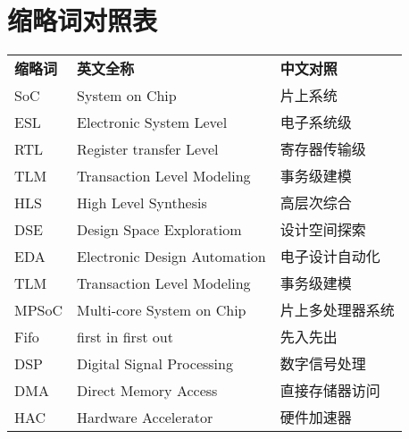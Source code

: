 
\chapter{缩略词对照表}
\begin{table}[]
  \normalsize
  \begin{tabular}{p{3cm}p{6cm}l}
  \textbf{缩略词} & \textbf{英文全称} & \textbf{中文对照}   \\
  SoC & System on Chip & 片上系统 \\
  ESL & Electronic System Level & 电子系统级 \\
  RTL & Register transfer Level & 寄存器传输级 \\
  TLM & Transaction Level Modeling & 事务级建模 \\
  HLS & High Level Synthesis & 高层次综合 \\
  DSE & Design Space Exploratiom & 设计空间探索 \\
  EDA & Electronic Design Automation & 电子设计自动化 \\
  TLM & Transaction Level Modeling & 事务级建模 \\
  MPSoC & Multi-core System on Chip & 片上多处理器系统 \\
  Fifo & first in first out & 先入先出 \\
  DSP & Digital Signal Processing & 数字信号处理 \\
  DMA & Direct Memory Access & 直接存储器访问 \\
  HAC & Hardware Accelerator & 硬件加速器 
  \end{tabular}
  \end{table}